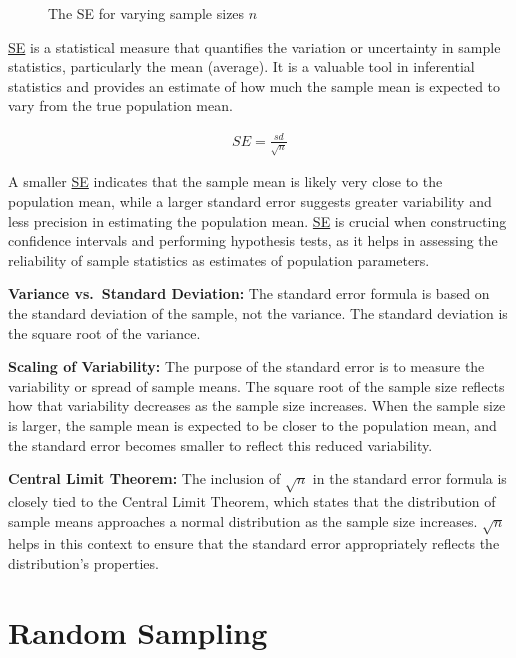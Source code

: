 \documentclass[
  a4paper,
]{scrbook}
\begin{document}
\begin{figure}[ht]
\begin{minipage}{0.50\linewidth}
{}


\end{minipage}%

\caption{\label{fig-se}The SE for varying sample sizes \(n\)}

\end{figure}%

\hyperref[acronyms_SE]{SE} is a statistical measure that quantifies the
variation or uncertainty in sample statistics, particularly the mean
(average). It is a valuable tool in inferential statistics and provides
an estimate of how much the sample mean is expected to vary from the
true population mean.

\begin{align}
SE = \frac{sd}{\sqrt{n}}
\end{align}

A smaller \hyperref[acronyms_SE]{SE} indicates that the sample mean is
likely very close to the population mean, while a larger standard error
suggests greater variability and less precision in estimating the
population mean. \hyperref[acronyms_SE]{SE} is crucial when constructing
confidence intervals and performing hypothesis tests, as it helps in
assessing the reliability of sample statistics as estimates of
population parameters.

\textbf{Variance vs.~Standard Deviation:} The standard error formula is
based on the standard deviation of the sample, not the variance. The
standard deviation is the square root of the variance.

\textbf{Scaling of Variability:} The purpose of the standard error is to
measure the variability or spread of sample means. The square root of
the sample size reflects how that variability decreases as the sample
size increases. When the sample size is larger, the sample mean is
expected to be closer to the population mean, and the standard error
becomes smaller to reflect this reduced variability.

\textbf{Central Limit Theorem:} The inclusion of \(\sqrt{n}\) in the
standard error formula is closely tied to the Central Limit Theorem,
which states that the distribution of sample means approaches a normal
distribution as the sample size increases. \(\sqrt{n}\) helps in this
context to ensure that the standard error appropriately reflects the
distribution's properties.

\section{Random Sampling}\label{random-sampling}
\end{document}
